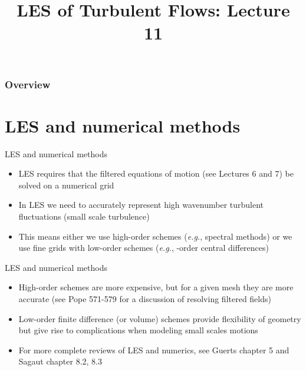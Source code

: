 
\title{LES of Turbulent Flows: Lecture 11}



\begin{frame} 
  \titlepage
\end{frame}


\begin{frame}
\frametitle{Overview}
\tableofcontents
\end{frame}

\section{LES and numerical methods} %

\begin{frame}{LES and numerical methods}

\begin{itemize}
\item LES requires that the filtered equations of motion (see Lectures 6 and 7) be solved on a numerical grid
\item In LES we need to accurately represent high wavenumber turbulent fluctuations (small scale turbulence)
\item This means either we use high-order schemes (\textit{e.g.}, spectral methods) or we use fine grids with low-order schemes (\textit{e.g.}, -order central differences)
\end{itemize}

\end{frame}


\begin{frame}{LES and numerical methods}

\begin{itemize}
\item High-order schemes are more expensive, but for a given mesh they are more accurate (see Pope 571-579 for a discussion of resolving filtered fields)
\item Low-order finite difference (or volume) schemes provide flexibility of geometry but give rise to complications when modeling small scales motions
\item For more complete reviews of LES and numerics, see Guerts chapter 5 and Sagaut chapter 8.2, 8.3

\end{itemize}

\end{frame}

